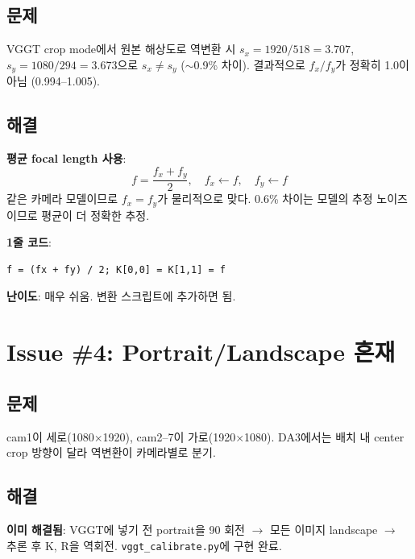 \documentclass[11pt, a4paper]{report}
\begin{document}
\subsection{문제}
VGGT crop mode에서 원본 해상도로 역변환 시 $s_x = 1920/518 = 3.707$, $s_y = 1080/294 = 3.673$으로 $s_x \neq s_y$ ($\sim$0.9\% 차이). 결과적으로 $f_x/f_y$가 정확히 1.0이 아님 (0.994--1.005).

\subsection{해결}

\begin{mathbox}
\textbf{평균 focal length 사용}:
\begin{equation}
f = \frac{f_x + f_y}{2}, \quad f_x \leftarrow f, \quad f_y \leftarrow f
\end{equation}
같은 카메라 모델이므로 $f_x = f_y$가 물리적으로 맞다. 0.6\% 차이는 모델의 추정 노이즈이므로 평균이 더 정확한 추정.
\end{mathbox}

\begin{devbox}
\textbf{1줄 코드}:
\begin{verbatim}
f = (fx + fy) / 2; K[0,0] = K[1,1] = f
\end{verbatim}
\textbf{난이도}: 매우 쉬움. 변환 스크립트에 추가하면 됨.
\end{devbox}


\section{Issue \#4: Portrait/Landscape 혼재}

\subsection{문제}
cam1이 세로(1080$\times$1920), cam2--7이 가로(1920$\times$1080). DA3에서는 배치 내 center crop 방향이 달라 역변환이 카메라별로 분기.

\subsection{해결}

\begin{devbox}
\textbf{이미 해결됨}: VGGT에 넣기 전 portrait을 90\textdegree{} 회전 $\rightarrow$ 모든 이미지 landscape $\rightarrow$ 추론 후 K, R을 역회전.
\texttt{vggt\_calibrate.py}에 구현 완료.
\end{devbox}
\end{document}
